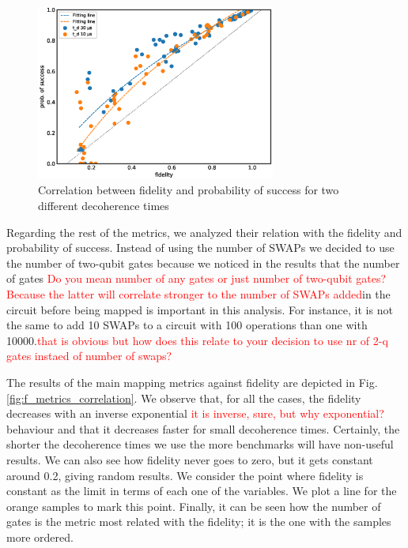 \begin{figure}[htbp]
\centering
\includegraphics[width=0.7\textwidth]{figures/f_ps_correlation.eps}
\caption{\label{fig:f_ps_correlation_with_meas_error}
Correlation between fidelity and probability of success for two different decoherence times}
\end{figure}



Regarding the rest of the metrics, we analyzed their relation with the fidelity and probability of success.
Instead of using the number of SWAPs we decided to use the number of two-qubit gates because we noticed in the results that the number of gates \textcolor{red}{Do you mean number of any gates or just number of two-qubit gates? Because the latter will correlate stronger to the number of SWAPs added}in the circuit before being mapped is important in this analysis.
For instance, it is not the same to add 10 SWAPs to a circuit with 100 operations than one with 10000.\textcolor{red}{that is obvious but how does this relate to your decision to use nr of 2-q gates instaed of number of swaps?}


The results of the main mapping metrics against fidelity are depicted in Fig. \ref{fig:f_metrics_correlation}.
We observe that, for all the cases, the fidelity decreases with an inverse exponential \textcolor{red}{it is inverse, sure, but why exponential?}behaviour and that it decreases faster for small decoherence times.
Certainly, the shorter the decoherence times we use the more benchmarks will have non-useful results.
We can also see how fidelity never goes to zero, but it gets constant around 0.2, giving random results.
We consider the point where fidelity is constant as the limit in terms of each one of the variables.
We plot a line for the orange samples to mark this point.
Finally, it can be seen how the number of gates is the metric most related with the fidelity; it is the one with the samples more ordered.

